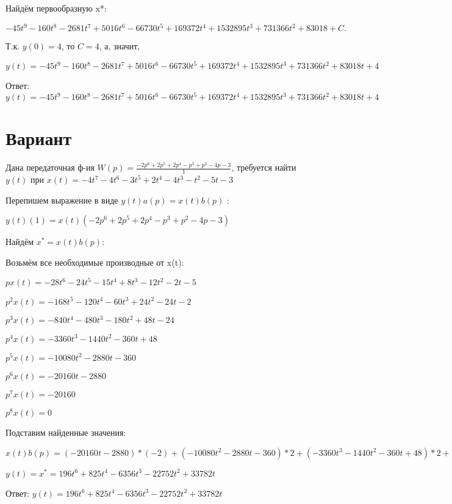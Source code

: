 \documentclass{article}
\begin{document}
{{{{{Найдём первообразную x*:

$-45t^{9}-160t^{8}-2681t^{7}+5016t^{6}-66730t^{5}+169372t^{4}+1532895t^{3}+731366t^{2}+83018+C.$

Т.к. $y(0)=4$, то $C=4$, а, значит, 

$y(t)=-45t^{9}-160t^{8}-2681t^{7}+5016t^{6}-66730t^{5}+169372t^{4}+1532895t^{3}+731366t^{2}+83018t+4$

Ответ: $y(t) = -45t^{9}-160t^{8}-2681t^{7}+5016t^{6}-66730t^{5}+169372t^{4}+1532895t^{3}+731366t^{2}+83018t+4$

\section{Вариант}

Дана передаточная ф-ия $W(p)=\frac{-2p^{6}+2p^{5}+2p^{4}-p^{3}+p^{2}-4p-3}{1}$, требуется найти $y(t)$ при $x(t)=-4t^{7}-4t^{6}-3t^{5}+2t^{4}-4t^{3}-t^{2}-5t-3$

Перепишем выражение в виде $y(t)a(p)=x(t)b(p)$ :

$y(t)(1)=x(t)(-2p^{6}+2p^{5}+2p^{4}-p^{3}+p^{2}-4p-3)$

Найдём $x^*=x(t)b(p)$:

Возьмём все необходимые производные от x(t):

$px(t)=-28t^{6}-24t^{5}-15t^{4}+8t^{3}-12t^{2}-2t-5$

$p^2x(t)=-168t^{5}-120t^{4}-60t^{3}+24t^{2}-24t-2$

$p^3x(t)=-840t^{4}-480t^{3}-180t^{2}+48t-24$

$p^4x(t)=-3360t^{3}-1440t^{2}-360t+48$

$p^5x(t)=-10080t^{2}-2880t-360$

$p^6x(t)=-20160t-2880$

$p^7x(t)=-20160$

$p^8x(t)=0$

Подставим найденные значения:

$x(t)b(p) = (-20160t-2880)*(-2)+(-10080t^{2}-2880t-360)*2+(-3360t^{3}-1440t^{2}-360t+48)*2+(-840t^{4}-480t^{3}-180t^{2}+48t-24)*(-1)+(-168t^{5}-120t^{4}-60t^{3}+24t^{2}-24t-2)*1+(-28t^{6}-24t^{5}-15t^{4}+8t^{3}-12t^{2}-2t-5)*(-4)+(-28t^{6}-24t^{5}-15t^{4}+8t^{3}-12t^{2}-2t-5)*(-3)=196t^{6}+825t^{4}-6356t^{3}-22752t^{2}+33782t$





$y(t)=x^*=196t^{6}+825t^{4}-6356t^{3}-22752t^{2}+33782t$

Ответ: $y(t) = 196t^{6}+825t^{4}-6356t^{3}-22752t^{2}+33782t$

}}}}}
\end{document}

